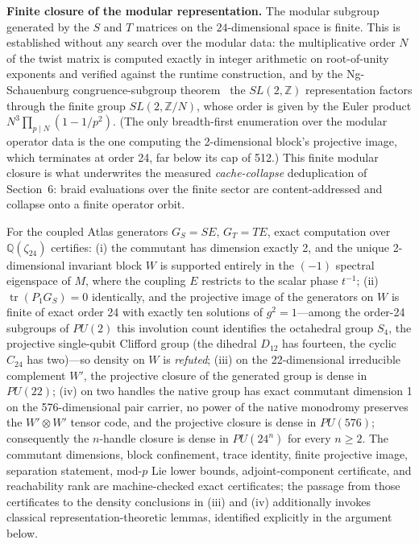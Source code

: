 \textbf{Finite closure of the modular representation.} The modular subgroup generated by the $S$ and $T$ matrices on the $24$-dimensional space is finite. This is established without any search over the modular data: the multiplicative order $N$ of the twist matrix is computed exactly in integer arithmetic on root-of-unity exponents and verified against the runtime construction, and by the Ng-Schauenburg congruence-subgroup theorem~\cite{ngschauenburg2010} the $SL(2, \mathbb{Z})$ representation factors through the finite group $SL(2, \mathbb{Z}/N)$, whose order is given by the Euler product $N^3 \prod_{p \mid N}(1 - 1/p^2)$. (The only breadth-first enumeration over the modular operator data is the one computing the 2-dimensional block's projective image, which terminates at order 24, far below its cap of 512.) This finite modular closure is what underwrites the measured \textit{cache-collapse} deduplication of Section~6: braid evaluations over the finite sector are content-addressed and collapse onto a finite operator orbit.

\begin{theorem}\label{thm:density}
For the coupled Atlas generators $G_S = SE$, $G_T = TE$, exact computation over $\mathbb{Q}(\zeta_{24})$ certifies:
(i) the commutant has dimension exactly 2, and the unique 2-dimensional invariant block $W$ is supported entirely in the $(-1)$ spectral eigenspace of $M$, where the coupling $E$ restricts to the scalar phase $t^{-1}$;
(ii) $\operatorname{tr}(P_1 G_S) = 0$ identically, and the projective image of the generators on $W$ is finite of exact order 24 with exactly ten solutions of $g^2 = 1$---among the order-24 subgroups of $PU(2)$ this involution count identifies the octahedral group $S_4$, the projective single-qubit Clifford group (the dihedral $D_{12}$ has fourteen, the cyclic $C_{24}$ has two)---so density on $W$ is \textit{refuted};
(iii) on the 22-dimensional irreducible complement $W'$, the projective closure of the generated group is dense in $PU(22)$;
(iv) on two handles the native group has exact commutant dimension 1 on the 576-dimensional pair carrier, no power of the native monodromy preserves the $W' \otimes W'$ tensor code, and the projective closure is dense in $PU(576)$; consequently the $n$-handle closure is dense in $PU(24^{n})$ for every $n \ge 2$.
The commutant dimensions, block confinement, trace identity, finite projective image, separation statement, mod-$p$ Lie lower bounds, adjoint-component certificate, and reachability rank are machine-checked exact certificates; the passage from those certificates to the density conclusions in (iii) and (iv) additionally invokes classical representation-theoretic lemmas, identified explicitly in the argument below.
\end{theorem}

